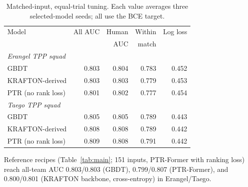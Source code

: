 \begin{table}[t]
\centering\footnotesize
\caption{Matched-input, equal-trial tuning. Each value averages three selected-model seeds; all use the BCE target.}
\label{tab:tuning}
\setlength{\tabcolsep}{3pt}
\begin{tabular}{lrrrr}
\toprule
Model & All AUC & Human & Within & Log loss \\
 & & AUC & match & \\
\midrule
\multicolumn{5}{l}{\emph{Erangel TPP squad}} \\
GBDT & 0.803 & 0.804 & 0.783 & 0.452 \\
KRAFTON-derived & 0.803 & 0.803 & 0.779 & 0.453 \\
PTR (no rank loss) & 0.801 & 0.802 & 0.777 & 0.454 \\
\multicolumn{5}{l}{\emph{Taego TPP squad}} \\
GBDT & 0.805 & 0.805 & 0.789 & 0.443 \\
KRAFTON-derived & 0.808 & 0.808 & 0.789 & 0.442 \\
PTR (no rank loss) & 0.809 & 0.808 & 0.791 & 0.442 \\
\bottomrule
\end{tabular}
\smallskip
\parbox{\columnwidth}{\scriptsize Reference recipes (Table~\ref{tab:main}; 151 inputs, PTR-Former with ranking loss) reach all-team AUC 0.803/0.803 (GBDT), 0.799/0.807 (PTR-Former), and 0.800/0.801 (KRAFTON backbone, cross-entropy) in Erangel/Taego.}
\end{table}
